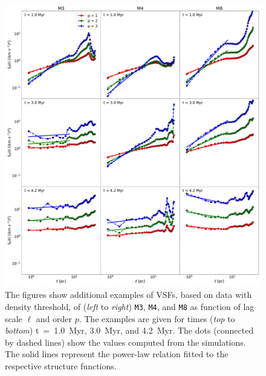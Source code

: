 \begin{figure}
    \centering
    \includegraphics[width=\textwidth]{app_examples_wthres_s_l.pdf}
    \caption{
        The figures show additional examples of VSFs, based on data with density threshold, of (\textit{left} to \textit{right}) \texttt{M3}, \texttt{M4}, and \texttt{M8} as function of lag scale $\ell$ and order $p$. 
        The examples are given for times (\textit{top} to \textit{bottom}) t~=~1.0~Myr, 3.0~Myr, and 4.2~Myr.
        The dots (connected by dashed lines) show the values computed from the simulations. 
        The solid lines represent the power-law relation fitted to the respective structure functions.
    }
    \label{pic:appInertial:examples_with_threshold_s_vs_l}
\end{figure}
 	
